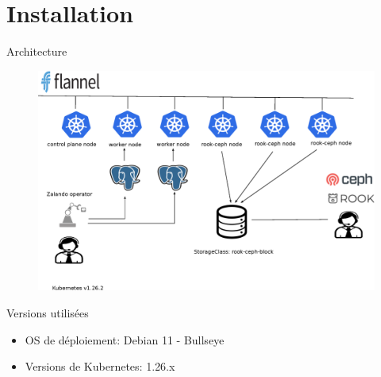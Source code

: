 \section{Installation}


\begin{frame}[fragile]{Architecture}

\begin{figure}
\begin{center}
\includegraphics[angle=0, width=\textwidth]{images/architecture.eps}
\end{center}
\end{figure}

\end{frame}


\begin{frame}[fragile]{Versions utilisées}

   \begin{itemize}
      \item OS de déploiement: Debian 11 - Bullseye
      \item Versions de Kubernetes: 1.26.x
   \end{itemize}

\end{frame}


